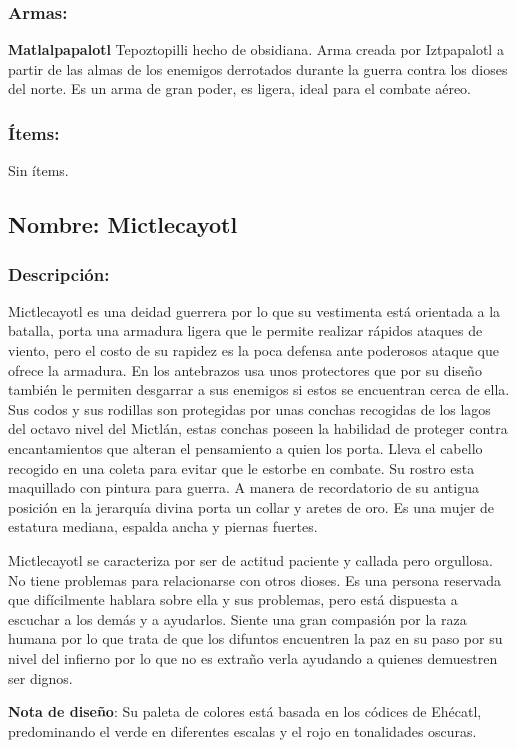 \documentclass[11pt,letterpaper]{article}
\begin{document}
\subsubsection{Armas:}
\textbf{Matlalpapalotl} Tepoztopilli hecho de obsidiana. Arma creada por Iztpapalotl a partir de las almas de los enemigos derrotados durante la guerra contra los dioses del norte. Es un arma de gran poder, es ligera, ideal para el combate aéreo.
\subsubsection{Ítems:}
Sin ítems.



\subsection{Nombre: Mictlecayotl}  

\subsubsection{Descripción:}
Mictlecayotl es una deidad guerrera por lo que su vestimenta está orientada a la batalla, porta una armadura ligera que le permite realizar rápidos ataques de viento, pero el costo de su rapidez es la poca defensa ante poderosos ataque que ofrece la armadura. En los antebrazos usa unos protectores que por su diseño también le permiten desgarrar a sus enemigos si estos se encuentran cerca de ella. Sus codos y sus rodillas son protegidas por unas conchas recogidas de los lagos del octavo nivel del Mictlán, estas conchas poseen la habilidad de proteger contra encantamientos que alteran el pensamiento a quien los porta. Lleva el cabello recogido en una coleta para evitar que le estorbe en combate. Su rostro esta maquillado con pintura para guerra. A manera de recordatorio de su antigua posición en la jerarquía divina porta un collar y aretes de oro. Es una mujer de estatura mediana, espalda ancha y piernas fuertes. 
\\
\par
Mictlecayotl se caracteriza por ser de actitud paciente y callada pero orgullosa. No tiene problemas para relacionarse con otros dioses. Es una persona reservada que difícilmente hablara sobre ella y sus problemas, pero está dispuesta a escuchar a los demás y a ayudarlos. Siente una gran compasión por la raza humana por lo que trata de que los difuntos encuentren la paz en su paso por su nivel del infierno por lo que no es extraño verla ayudando a quienes demuestren ser dignos.  
\\
\par
\textbf{Nota de diseño}: Su paleta de colores está basada en los códices de Ehécatl, predominando el verde en diferentes escalas y el rojo en tonalidades oscuras. 	  
\end{document}
